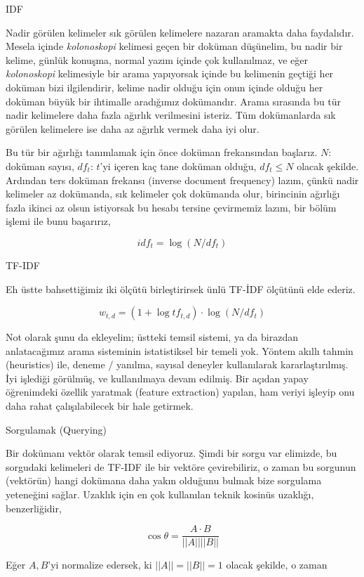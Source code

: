 \documentclass[12pt,fleqn]{article}\usepackage{../../common}
\begin{document}
IDF

Nadir görülen kelimeler sık görülen kelimelere nazaran aramakta daha
faydalıdır. Mesela içinde {\em kolonoskopi} kelimesi geçen bir doküman
düşünelim, bu nadir bir kelime, günlük konuşma, normal yazım içinde çok
kullanılmaz, ve eğer {\em kolonoskopi} kelimesiyle bir arama yapıyorsak içinde
bu kelimenin geçtiği her doküman bizi ilgilendirir, kelime nadir olduğu için
onun içinde olduğu her doküman büyük bir ihtimalle aradığımız dokümandır. Arama
sırasında bu tür nadir kelimelere daha fazla ağırlık verilmesini isteriz. Tüm
dokümanlarda sık görülen kelimelere ise daha az ağırlık vermek daha iyi olur.

Bu tür bir ağırlığı tanımlamak için önce doküman frekansından başlarız. $N$:
doküman sayısı, $df_t$: $t$'yi içeren kaç tane doküman olduğu, $df_t \le N$
olacak şekilde. Ardından ters doküman frekansı (inverse document frequency)
lazım, çünkü nadir kelimeler az dokümanda, sık kelimeler çok dokümanda olur,
birincinin ağırlığı fazla ikinci az olsun istiyorsak bu hesabı tersine
çevirmemiz lazım, bir bölüm işlemi ile bunu başarırız,

$$ idf_t = \log (N/df_t) $$

TF-IDF

Eh üstte bahsettiğimiz iki ölçütü birleştirirsek ünlü TF-İDF ölçütünü elde
ederiz. 

$$ w_{t,d} = (1+\log tf_{t,d}) \cdot \log (N/df_t)  $$

Not olarak şunu da ekleyelim; üstteki temsil sistemi, ya da birazdan
anlatacağımız arama sisteminin istatistiksel bir temeli yok. Yöntem akıllı
tahmin (heuristics) ile, deneme / yanılma, sayısal deneyler kullanılarak
kararlaştırılmış. İyi işlediği görülmüş, ve kullanılmaya devam edilmiş. Bir
açıdan yapay öğrenimdeki özellik yaratmak (feature extraction) yapılan, ham
veriyi işleyip onu daha rahat çalışılabilecek bir hale getirmek. 

Sorgulamak (Querying)

Bir dokümanı vektör olarak temsil ediyoruz. Şimdi bir sorgu var elimizde, bu
sorgudaki kelimeleri de TF-IDF ile bir vektöre çevirebiliriz, o zaman bu
sorgunun (vektörün) hangi dokümana daha yakın olduğunu bulmak bize sorgulama
yeteneğini sağlar. Uzaklık için en çok kullanılan teknik kosinüs uzaklığı,
benzerliğidir,

$$
\cos\theta = \frac{A \cdot B}{||A||||B||}
$$

Eğer $A,B$'yi normalize edersek, ki $||A||=||B||=1$ olacak şekilde, o zaman
\end{document}
